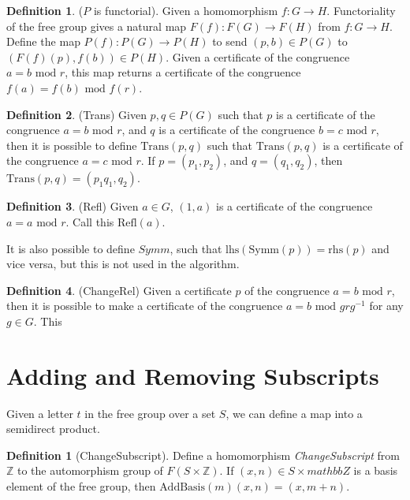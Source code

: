 \documentclass[11pt]{article} %
\theoremstyle{definition}
\theoremstyle{definition}
\theoremstyle{definition}
\theoremstyle{definition}
\theoremstyle{definition}
\newtheorem{defn}[theorem]{Definition}
\theoremstyle{definition}
\newtheorem{subdef}{Definition}[theorem]
\begin{document}
\begin{subdef}($P$ is functorial).
  Given a homomorphism $f : G \to H$.
  Functoriality of the free group gives a natural map $F(f) : F(G) \to F(H)$ from $f : G \to H$.
  Define the map $P(f) : P(G) \to P(H)$ to send $(p, b) \in P(G)$ to $(F(f)(p), f(b)) \in P(H)$.
  Given a certificate of the congruence $a = b \text{ mod } r$, this map returns
  a certificate of the congruence $f(a) = f(b) \text{ mod } f(r)$.
\end{subdef}


\begin{subdef}(Trans)
  Given $p,q \in P(G)$ such that $p$ is a certificate of the congruence $a = b \text{ mod } r$,
  and $q$ is a certificate of the congruence $b = c \text{ mod } r$, then it is possible to define
  $\text{Trans}(p,q)$ such that $\text{Trans}(p,q)$ is a certificate of the congruence $a = c \text{ mod } r$.
  If $p = (p_1, p_2)$, and $q = (q_1, q_2)$, then $\text{Trans}(p,q) = (p_1q_1, q_2)$.
\end{subdef}

\begin{subdef}(Refl)
  Given $a \in G$, $(1, a)$ is a certificate of the congruence $a = a \text{ mod } r$. Call
  this $\text{Refl}(a)$.
\end{subdef}

It is also possible to define $\textit{Symm}$, such that $\text{lhs}(\text{Symm}(p)) = \text{rhs}(p)$
and vice versa, but this is not used in the algorithm.

\begin{subdef}(ChangeRel)
  Given a certificate $p$ of the congruence $a = b \text{ mod } r$, then it is possible
  to make a certificate of the congruence $a = b \text{ mod } g r g^{-1}$ for any $g \in G$.
  This
\end{subdef}

\section{Adding and Removing Subscripts}

Given a letter $t$ in the free group over a set $S$, we can define a map into a
semidirect product.

\begin{defn}[ChangeSubscript]\label{changesubscript}
  Define a homomorphism \textit{ChangeSubscript} from $\mathbb{Z}$ to the automorphism
  group of $F(S \times \mathbb{Z})$. If $(x, n) \in S \times mathbb{Z}$ is a basis
  element of the free group, then $\text{AddBasis}(m)(x, n) = (x, m + n)$.
\end{defn}
\end{document}

